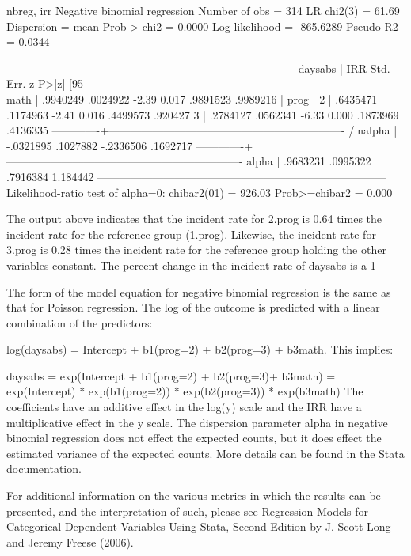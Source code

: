 nbreg, irr
Negative binomial regression                      Number of obs   =        314
LR chi2(3)      =      61.69
Dispersion     = mean                             Prob > chi2     =     0.0000
Log likelihood = -865.6289                        Pseudo R2       =     0.0344

------------------------------------------------------------------------------
daysabs |        IRR   Std. Err.      z    P>|z|     [95%
-------------+----------------------------------------------------------------
math |   .9940249   .0024922    -2.39   0.017     .9891523    .9989216
|
prog |
2  |   .6435471   .1174963    -2.41   0.016     .4499573     .920427
3  |   .2784127   .0562341    -6.33   0.000     .1873969    .4136335
-------------+----------------------------------------------------------------
/lnalpha |  -.0321895   .1027882                     -.2336506    .1692717
-------------+----------------------------------------------------------------
alpha |   .9683231   .0995322                      .7916384    1.184442
------------------------------------------------------------------------------
Likelihood-ratio test of alpha=0:  chibar2(01) =  926.03 Prob>=chibar2 = 0.000

The output above indicates that the incident rate for 2.prog is 0.64 times the incident rate for the reference group (1.prog). Likewise, the incident rate for 3.prog is 0.28 times the incident rate for the reference group holding the other variables constant. The percent change in the incident rate of daysabs is a 1%

The form of the model equation for negative binomial regression is the same as that for Poisson regression. The log of the outcome is predicted with a linear combination of the predictors:

log(daysabs) = Intercept + b1(prog=2) + b2(prog=3) + b3math.
This implies:

daysabs = exp(Intercept + b1(prog=2) + b2(prog=3)+ b3math) = exp(Intercept) * exp(b1(prog=2)) * exp(b2(prog=3)) * exp(b3math)
The coefficients have an additive effect in the log(y) scale and the IRR have a multiplicative effect in the y scale. The dispersion parameter alpha in negative binomial regression does not effect the expected counts, but it does effect the estimated variance of the expected counts. More details can be found in the Stata documentation.

For additional information on the various metrics in which the results can be presented, and the interpretation of such, please see Regression Models for Categorical Dependent Variables Using Stata, Second Edition by J. Scott Long and Jeremy Freese (2006).

